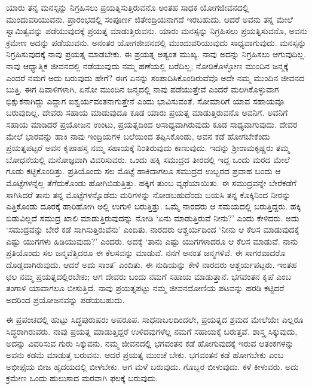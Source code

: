 ಯಾರು ತನ್ನ ಮನಸ್ಸನ್ನು ನಿಗ್ರಹಿಸಲು ಪ್ರಯತ್ನಿಸುತ್ತಿರುವನೊ ಅಂತಹ ಸಾಧಕ ಯೋಗಜೀವನದಲ್ಲಿ ಮುಂದುವರಿಯುವನು. ಪ್ರಾರಂಭದಲ್ಲಿ ಸಂಪೂರ್ಣ ಜಿತೇಂದ್ರಿಯನಾಗದೆ ಇರಬಹುದು. ಆದರೆ ಅವನು ತನ್ನ ಮೇಲೆ ಸ್ವಾಮಿತ್ವವನ್ನು ಪಡೆಯುವುದಕ್ಕೆ ಪ್ರಯತ್ನ ಮಾಡುತ್ತಿರುವನು. ಯಾರು ಮನಸ್ಸನ್ನು ನಿಗ್ರಹಿಸಲು ಪ್ರಯತ್ನಿಸುವನೊ, ಅವನು ಕ್ರಮೇಣ ಅದನ್ನು ಪಡೆಯುವನು. ಅನಂತರ ಯೋಗಜೀವನದಲ್ಲಿ ಮುಂದುವರಿಯುವುದು ಸಾಧ್ಯವಾಗುವುದು. ಮನಸ್ಸನ್ನು ನಿಗ್ರಹಿಸುವುದಕ್ಕೆ ನಾವು ಪ್ರಯತ್ನ ಮಾಡಬೇಕು. ಈ ಪ್ರಯತ್ನ ಅತ್ಯಂತ ಮುಖ್ಯ. ನಾವು ಅದನ್ನು ನಿಗ್ರಹಿಸಲು ಆಗುವುದಿಲ್ಲ. ನಾವು ಆಧ್ಯಾತ್ಮಿಕ ಜೀವನದಲ್ಲಿ ನಡೆಯುವುದು ನಮ್ಮ ಹಣೆಯಲ್ಲಿ ಬರೆದಿಲ್ಲ; ನೋಡಿಕೊಳ್ಳೋಣ ಮುಂದಿನ ಜನ್ಮಕ್ಕೆ ಎಂದರೆ ನಮಗೆ ಅದು ಬರುವುದು ಹೇಗೆ? ಈಗ ಏನನ್ನು ಸಂಪಾದಿಸಿಕೊಂಡಿರುವೆವೊ ಅದೇ ನಮ್ಮ ಮುಂದಿನ ಜೀವನದ ಬುತ್ತಿ. ಈಗ ದಿವಾಳಿಗಳಾಗಿ, ಏನೋ ಮುಂದಿನ ಜನ್ಮದಲ್ಲಿ ನಾವು ಪಡೆಯುತ್ತೇವೆ ಎಂದರೆ ಮಲಗಿಕೊಳ್ಳುವಾಗ ಭಿಕ್ಷುಕನಾಗಿದ್ದು ಎದ್ದಾಗ ಐಶ್ವರ್ಯವಂತನಾಗುತ್ತೇನೆ ಎಂದು ಭಾವಿಸುವಂತೆ. ಸೋಮಾರಿಗೆ ಯಾವ ಸಹಾಯವೂ ಬರುವುದಿಲ್ಲ. ದೇವರು ಸಹಾಯ ಮಾಡುವುದೂ ಕೂಡ ಯಾರು ಪ್ರಯತ್ನ ಮಾಡುತ್ತಿರುವನೊ ಅವನಿಗೆ. ಅವನಿಗೆ ಸಹಾಯ ಮಾಡಿದರೆ ಪ್ರಯೋಜನ ಉಂಟು, ಪ್ರಯತ್ನದಿಂದ ಅಸಾಧ್ಯವಾಗಿರುವುದು ಕೂಡ ಸಾಧ್ಯವಾಗುವುದು. ದೇವರ ಮೇಲೆ ಭಾರವನ್ನು ಹಾಕಿ ನಾವು ಇಂದ್ರಿಯಗಳ ಬಲೆಯಿಂದ ತಪ್ಪಿಸಿಕೊಂಡು, ಅವನ ಕಡೆ ಹೋಗಬೇಕೆಂದು ಪ್ರಯತ್ನಪಟ್ಟರೆ ಅವನ ಕೃಪಾಹಸ್ತ ನಮ್ಮ ಸಹಾಯಕ್ಕೆ ನಿಂತಿರುವುದು ಕಾಣುವುದು. ಇದನ್ನು ಶ‍್ರೀರಾಮಕೃಷ್ಣರು ತಮ್ಮ ಬೋಧನೆಯಲ್ಲಿ ಮನೋಜ್ಞವಾಗಿ ವಿವರಿಸುವರು. ಒಂದು ಹಕ್ಕಿ ಸಮುದ್ರದ ತೀರದಲ್ಲಿ ಇದ್ದ ಒಂದು ಮರದ ಮೇಲೆ ಗೂಡು ಕಟ್ಟಿಕೊಂಡಿತ್ತು. ಪ್ರತಿಯೊಂದು ಸಲ ಮೊಟ್ಟೆ ಹಾಕಿದಾಗಲೂ ಸಮುದ್ರದ ಉಬ್ಬರದ ಪ್ರವಾಹ ಬಂದು ಆ ಮೊಟ್ಟೆಗಳನ್ನೆಲ್ಲ ತೆಗೆದುಕೊಂಡು ಹೋಗಿಬಿಡುತ್ತಿತ್ತು. ಹಕ್ಕಿಗೆ ತುಂಬ ವ್ಯಥೆಯಾಯಿತು. ಈ ಸಮುದ್ರವನ್ನೇ ಬೇರೆಕಡೆಗೆ ಸಾಗಿಸಿದರೆ ತಾನು ತನ್ನ ಮೊಟ್ಟೆಗಳನ್ನೊಡೆದು ಮರಿಗಳನ್ನು ನೋಡಬಹುದೆಂದು ಬಯಸಿ ತನ್ನ ಕೊಕ್ಕಿನಿಂದ ನೀರನ್ನು ಎತ್ತಿಕೊಂಡು ದೂರಕ್ಕೆ ಹಾರಿಹೋಗಿ ಅಲ್ಲಿ ಉಗುಳಿ ಬರುತ್ತಿತ್ತು. ಒಮ್ಮೆ ನಾರದರು ಆ ಸಮಯದಲ್ಲಿ ಬರುತ್ತಿದ್ದರು. ಹಕ್ಕಿ ಬಿಡುವಿಲ್ಲದೆ ಸಮುದ್ರ ಖಾಲಿ ಮಾಡುತ್ತಿರುವುದನ್ನು ನೋಡಿ ‘ಏನು ಮಾಡುತ್ತಿರುವೆ ನೀನು?’ ಎಂದು ಕೇಳಿದರು. ಅದು ‘ಸಮುದ್ರವನ್ನು ಬೇರೆ ಕಡೆ ಸಾಗಿಸುತ್ತಿರುವೆನು’ ಎಂದಿತು. ನಾರದರು ಆಶ್ಚರ್ಯದಿಂದ ‘ನೀನು ಆ ಕೆಲಸ ಮಾಡುವುದಕ್ಕೆ ಎಷ್ಟು ಯುಗಗಳು ಹಿಡಿಯುವುದು?’ ಎಂದರು. ಅದಕ್ಕೆ ‘ತಾನು ಎಷ್ಟು ಯುಗಗಳಾದರೂ ಆ ಕೆಲಸ ಮಾಡುವೆ. ನಾನು ಪ್ರತಿಯೊಂದು ಸಲ ಜನ್ಮವೆತ್ತಿದರೂ ಈ ಕೆಲಸವನ್ನು ಮಾಡುವೆ. ನನಗೆ ಅನಂತ ಜನ್ಮಗಳಿವೆ. ಈ ಸಾಗರವಾದರೊ ದೊಡ್ಡದಾಗಿರುವುದು. ಆದರೆ ಅದು ಸಾಂತ’ ಎಂದಿತು. ಈ ನುಡಿಯನ್ನು ಕೇಳಿ ನಾರದರು ಆಶ್ಚರ್ಯಪಟ್ಟರು. ಇಂತಹ ಛಲ ನಮ್ಮ ಪ್ರಯತ್ನದಲ್ಲಿರಬೇಕು; ಆಗ ದೇವರು ಬಂದು ನಮಗೆ ಸಹಾಯ ಮಾಡುತ್ತಾನೆ. ಭಗವಂತನ ಕೃಪೆ ಎಂಬ ತಂಗಾಳಿ ಯಾವಾಗಲೂ ಬೀಸುತ್ತಿದೆ. ನಾವು ಪ್ರಯತ್ನಪಟ್ಟು ನಮ್ಮ ಜೀವನದೋಣಿಯ ಪಟವನ್ನು ಹರಡಿ ಕಟ್ಟಿದರೆ ಅದರಿಂದ ಪ್ರಯೋಜನವನ್ನು ಪಡೆಯಬಹುದು.

ಈ ಪ್ರಪಂಚದಲ್ಲಿ ಹುಟ್ಟು ಸಿದ್ಧಪುರುಷರು ಅಪರೂಪ. ಸಾಧನಾಬಲದಿಂದಲೇ, ಪ್ರಯತ್ನದ ಶ್ರಮದ ಮೇಲೆಯೇ ಎಲ್ಲರೂ ಸಿದ್ಧರಾಗಿರುವರು. ನಾವು ಪ್ರಯತ್ನ ಮಾಡುತ್ತಿದ್ದರೆ ಉಳಿದವುಗಳೆಲ್ಲ ನಮಗೆ ಸಹಾಯಕ್ಕೆ ಬರುತ್ತವೆ. ಶಾಸ್ತ್ರ ಸಿಕ್ಕುವುದು, ಅದನ್ನು ವಿವರಿಸುವ ಗುರು ಸಿಕ್ಕುವನು. ನಮ್ಮ ಜೀವನದಲ್ಲಿ ಭಗವಂತನ ಕಡೆ ಹೋಗುವುದಕ್ಕೆ ಇರುವ ಆತಂಕಗಳನ್ನು ಅವನು ಕಡಮೆ ಮಾಡುತ್ತ ಬರುವನು. ಆದರೆ ಪ್ರಯತ್ನ ಮುಂಚೆ ಬೇಕು. ಭಗವಂತನ ಕಡೆ ಹೋಗಬೇಕು ಎಂಬ ಅಭೀಪ್ಸೆಯ ಬೀಜ ಹೃದಯದಲ್ಲಿ ಬೀಳಬೇಕು. ಆಗ ಮಳೆ ಬರುವುದು. ಗೊಬ್ಬರ ಬೀಳುವುದು. ಕಳೆ ಕೀಳುವರು. ಅದು ಕ್ರಮೇಣ ಒಂದು ಹುಲುಸಾದ ಮರವಾಗಿ ಫಲಕ್ಕೆ ಬರುವುದು.

